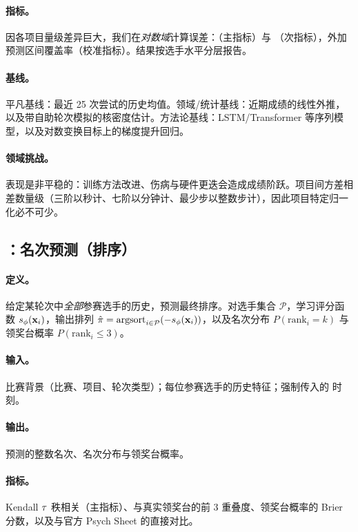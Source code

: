 \paragraph{指标。}因各项目量级差异巨大，我们在\emph{对数域}计算误差：\maelog{}（主指标）与 \rmselog{}（次指标），外加预测区间覆盖率（校准指标）。结果按选手水平分层报告。

\paragraph{基线。}平凡基线：最近 25 次尝试的历史均值。领域/统计基线：近期成绩的线性外推，以及带自助轮次模拟的核密度估计。方法论基线：LSTM/Transformer 等序列模型，以及对数变换目标上的梯度提升回归。

\paragraph{领域挑战。}表现是非平稳的：训练方法改进、伤病与硬件更迭会造成成绩阶跃。项目间方差相差数量级（三阶以秒计、七阶以分钟计、最少步以整数步计），因此项目特定归一化必不可少。

\subsection{：名次预测（排序）}
\label{sec:task2}

\paragraph{定义。}给定某轮次中\emph{全部}参赛选手的历史，预测最终排序。对选手集合 $\mathcal{P}$，学习评分函数 $s_\phi(\mathbf{x}_i)$，输出排列 $\hat{\pi} = \mathrm{argsort}_{i \in \mathcal{P}}(-s_\phi(\mathbf{x}_i))$，以及名次分布 $P(\mathrm{rank}_i = k)$ 与领奖台概率 $P(\mathrm{rank}_i \le 3)$。

\paragraph{输入。}比赛背景（比赛、项目、轮次类型）；每位参赛选手的历史特征；强制传入的 \asof{} 时刻。

\paragraph{输出。}预测的整数名次、名次分布与领奖台概率。

\paragraph{指标。}Kendall $\tau$ 秩相关（主指标）、与真实领奖台的前 3 重叠度、领奖台概率的 Brier 分数，以及与官方 \wca{} Psych Sheet 的直接对比。

